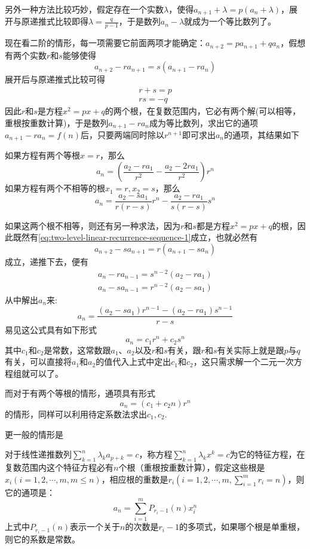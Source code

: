 另外一种方法比较巧妙，假定存在一个实数$\lambda$，使得$a_{n+1}+\lambda=p(a_n+\lambda)$，展开与原递推式比较即得$\lambda=\frac{q}{p-1}$，于是数列$a_n-\lambda$就成为一个等比数列了。

现在看二阶的情形，每一项需要它前面两项才能确定：$a_{n+2}=pa_{n+1}+qa_n$，假想有两个实数$r$和$s$能够使得
\begin{equation}
  \label{eq:two-level-linear-recurrence-sequence-1}
a_{n+2}-ra_{n+1}=s(a_{n+1}-ra_n)
\end{equation}
展开后与原递推式比较可得
\begin{align*}
  r+s  =  p \\
  rs  =  -q
\end{align*}
因此$r$和$s$是方程$x^2=px+q$的两个根，在复数范围内，它必有两个解(可以相等，重根按重数计算)，于是数列$a_{n+1}-ra_{n}$成为等比数列，求出它的通项$a_{n+1}-ra_n=f(n)$后，只要两端同时除以$r^{n+1}$即可求出$a_n$的通项，其结果如下

如果方程有两个等根$x=r$，那么
\[ a_n = \left( \frac{a_2-ra_1}{r^2} - \frac{a_2-2ra_1}{r^2} \right)r^n \]
如果方程有两个不相等的根$x_1=r,x_2=s$，那么
\[ a_n = \frac{a_2-sa_1}{r(r-s)} r^n - \frac{a_2-ra_1}{s(r-s)} s^n \]

如果这两个根不相等，则还有另一种求法，因为$r$和$s$都是方程$x^2=px+q$的根，因此既然有\ref{eq:two-level-linear-recurrence-sequence-1}成立，也就必然有
\begin{equation}
  \label{eq:two-level-linear-recurrence-sequence-2}
a_{n+2}-sa_{n+1}=r(a_{n+1}-sa_n)
\end{equation}
成立，递推下去，便有
\begin{align*}
  a_{n}-ra_{n-1}  =  s^{n-2}(a_2-ra_1) \\
  a_{n}-sa_{n-1}  =  r^{n-2}(a_2-sa_1) 
\end{align*}
从中解出$a_n$来:
\[ a_n=\frac{(a_2-sa_1)r^{n-1}-(a_2-ra_1)s^{n-1}}{r-s} \]
易见这公式具有如下形式
\[ a_n=c_1r^n+c_2s^n \]
其中$c_1$和$c_2$是常数，这常数跟$a_1$、$a_2$以及$r$和$s$有关，跟$r$和$s$有关实际上就是跟$p$与$q$有关，可以直接将$a_1$和$a_2$的值代入上式中定出$c_1$和$c_2$，这只需求解一个二元一次方程组就可以了。

而对于有两个等根的情形，通项具有形式
\[ a_n = (c_1+c_2n)r^n \]
的情形，同样可以利用待定系数法求出$c_1,c_2$.

更一般的情形是
\begin{theorem}
对于线性递推数列$\sum_{k=1}^n\lambda_k a_{p+k}=c$，称方程$\sum_{k=1}^n\lambda _k x^k = c$为它的特征方程，在复数范围内这个特征方程必有$n$个根（重根按重数计算），假定这些根是 $x_i(i=1,2,\cdots,m, m \leq n)$，相应根的重数是$r_i(i=1,2,\cdots,m, \sum_{i=1}^mr_i=n)$，则它的通项是：
\[ a_n=\sum_{i=1}^mP_{r_i-1}(n)x_i^n \]
上式中$P_{r_i-1}(n)$表示一个关于$n$的次数是$r_i-1$的多项式，如果哪个根是单重根，则它的系数是常数。
\end{theorem}

